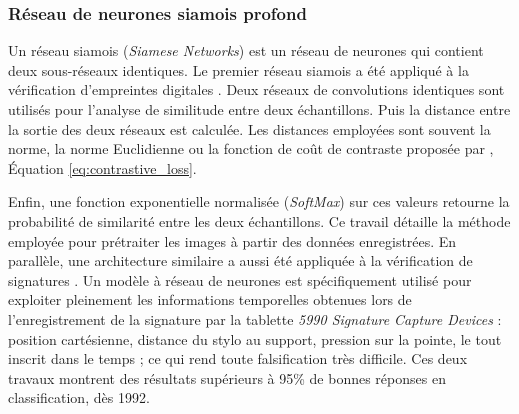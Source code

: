 
\subsubsection{Réseau de neurones siamois profond} \label{subsubsec:siamese}
Un réseau siamois (\textit{Siamese Networks}) est un réseau de neurones qui contient deux sous-réseaux identiques.
Le premier réseau siamois a été appliqué à la vérification d'empreintes digitales \cite{baldi_neural_1993}.
Deux réseaux de convolutions identiques sont utilisés pour l'analyse de similitude entre deux échantillons.
Puis la distance entre la sortie des deux réseaux est calculée.
Les distances employées sont souvent la norme, la norme Euclidienne ou la fonction de coût de contraste proposée par \cite{hadsell_dimensionality_2006}, Équation \ref{eq:contrastive_loss}.

Enfin, une fonction exponentielle normalisée (\textit{SoftMax}) sur ces valeurs retourne la probabilité de similarité entre les deux échantillons.
Ce travail détaille la méthode employée pour prétraiter les images à partir des données enregistrées.
En parallèle, une architecture similaire a aussi été appliquée à la vérification de signatures \cite{bromley_signature_1993}.
Un modèle à réseau de neurones est spécifiquement utilisé pour exploiter pleinement les informations temporelles obtenues lors de l'enregistrement de la signature par la tablette \textit{5990 Signature Capture Devices} : position cartésienne, distance du stylo au support, pression sur la pointe, le tout inscrit dans le temps ; ce qui rend toute falsification très difficile.
Ces deux travaux montrent des résultats supérieurs à 95\% de bonnes réponses en classification, dès 1992.

